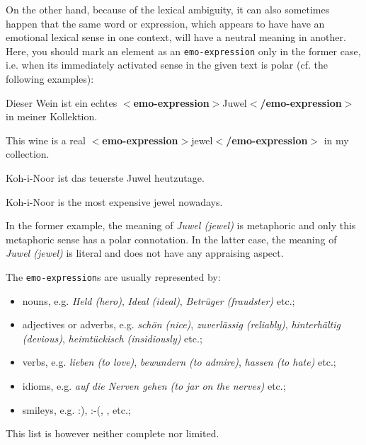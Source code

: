 \documentclass[11pt,a4paper]{article}
\newcommand{\xmltag}[1]{{\textbf{\small$<$#1$>$}}}
\newcommand{\emoexpression}[1]{\xmltag{emo-expression}#1\xmltag{/emo-expression}}
\newenvironment{myexe}{
  \begin{exe}
    \ex\begin{center}
    \itshape
}{
    \end{center}
  \end{exe}
}
\begin{document}
On the other hand, because of the lexical ambiguity, it can also sometimes
happen that the same word or expression, which appears to have have an
emotional lexical sense in one context, will have a neutral meaning in
another.  Here, you should mark an element as an \texttt{emo-expression} only
in the former case, i.e. when its immediately activated sense in the given
text is polar (cf. the following examples):
\begin{myexe}
  Dieser Wein ist ein echtes \emoexpression{Juwel} in meiner Kollektion.

  This wine is a real \emoexpression{jewel} in my collection.
\end{myexe}
\begin{myexe}
  Koh-i-Noor ist das teuerste Juwel heutzutage.

  Koh-i-Noor is the most expensive jewel nowadays.
\end{myexe}
In the former example, the meaning of \textit{Juwel (jewel)} is metaphoric and
only this metaphoric sense has a polar connotation.  In the latter case, the
meaning of \textit{Juwel (jewel)} is literal and does not have any appraising
aspect.

The \texttt{emo-expression}s are usually represented by:
\begin{itemize}
  \item nouns, e.g. \textit{Held (hero)}, \textit{Ideal (ideal)},
    \textit{Betr\"uger (fraudster)} etc.;

  \item adjectives or adverbs, e.g. \textit{sch\"on (nice)},
    \textit{zuverl\"assig (reliably)}, \textit{hinterh\"altig
      (devious)}, \textit{heimt\"uckisch (insidiously)} etc.;

  \item verbs, e.g. \textit{lieben (to love)}, \textit{bewundern (to
    admire)}, \textit{hassen (to hate)} etc.;

  \item idioms, e.g. \textit{auf die Nerven gehen (to jar on the
    nerves)} etc.;

  \item smileys, e.g. :), :-(, \smiley{}, \frownie{} etc.;
\end{itemize}
This list is however neither complete nor limited.
\end{document}

